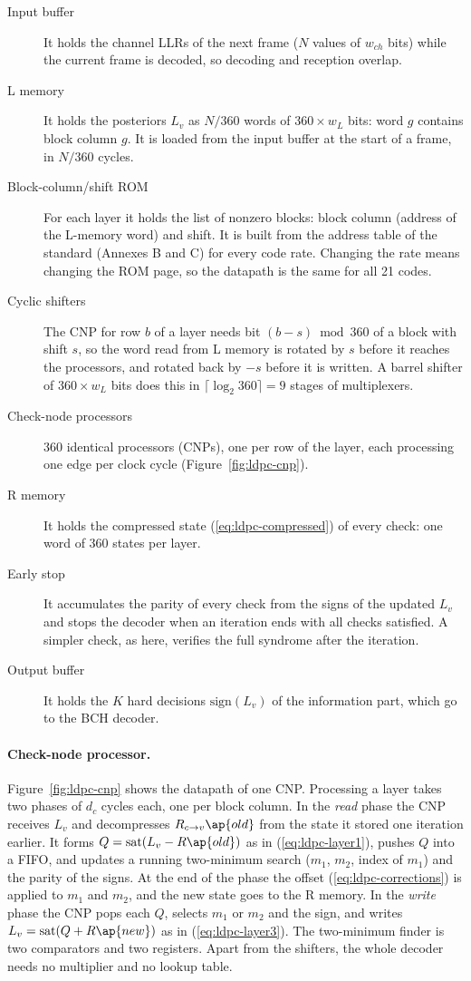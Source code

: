 \begin{description}
\item[Input buffer] It holds the channel LLRs of the next frame (\(N\) values of \(w_{ch}\) bits) while the current frame is decoded, so decoding and reception overlap.
\item[L memory] It holds the posteriors \(L_v\) as \(N/360\) words of \(360 \times w_L\) bits: word \(g\) contains block column \(g\). It is loaded from the input buffer at the start of a frame, in \(N/360\) cycles.
\item[Block-column/shift ROM] For each layer it holds the list of nonzero blocks: block column (address of the L-memory word) and shift. It is built from the address table of the standard (Annexes B and C) for every code rate. Changing the rate means changing the ROM page, so the datapath is the same for all 21 codes.
\item[Cyclic shifters] The CNP for row \(b\) of a layer needs bit \((b - s) \bmod 360\) of a block with shift \(s\), so the word read from L memory is rotated by \(s\) before it reaches the processors, and rotated back by \(-s\) before it is written. A barrel shifter of \(360 \times w_L\) bits does this in \(\lceil \log_2 360 \rceil = 9\) stages of multiplexers.
\item[Check-node processors] 360 identical processors (CNPs), one per row of the layer, each processing one edge per clock cycle (Figure~\ref{fig:ldpc-cnp}).
\item[R memory] It holds the compressed state (\ref{eq:ldpc-compressed}) of every check: one word of \(360\) states per layer.
\item[Early stop] It accumulates the parity of every check from the signs of the updated \(L_v\) and stops the decoder when an iteration ends with all checks satisfied. A simpler check, as here, verifies the full syndrome after the iteration.
\item[Output buffer] It holds the \(K\) hard decisions \(\mathrm{sign}(L_v)\) of the information part, which go to the BCH decoder.
\end{description}

\paragraph{Check-node processor.} Figure~\ref{fig:ldpc-cnp} shows the datapath of one CNP. Processing a layer takes two phases of \(d_c\) cycles each, one per block column. In the \emph{read} phase the CNP receives \(L_v\) and decompresses \(R_{c \to v}\ap{old}\) from the state it stored one iteration earlier. It forms \(Q = \mathrm{sat}(L_v - R\ap{old})\) as in (\ref{eq:ldpc-layer1}), pushes \(Q\) into a FIFO, and updates a running two-minimum search (\(m_1\), \(m_2\), index of \(m_1\)) and the parity of the signs. At the end of the phase the offset (\ref{eq:ldpc-corrections}) is applied to \(m_1\) and \(m_2\), and the new state goes to the R memory. In the \emph{write} phase the CNP pops each \(Q\), selects \(m_1\) or \(m_2\) and the sign, and writes \(L_v = \mathrm{sat}(Q + R\ap{new})\) as in (\ref{eq:ldpc-layer3}). The two-minimum finder is two comparators and two registers. Apart from the shifters, the whole decoder needs no multiplier and no lookup table.

